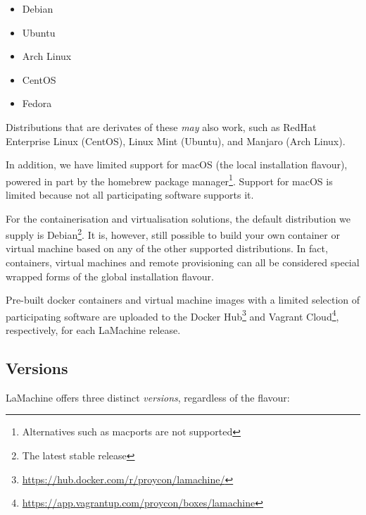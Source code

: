 \documentclass[a4paper,11pt]{article}
\begin{document}
\begin{itemize}
    \item Debian
    \item Ubuntu
    \item Arch Linux
    \item CentOS
    \item Fedora
\end{itemize}

Distributions that are derivates of these \emph{may} also work, such as RedHat Enterprise Linux (CentOS), Linux Mint (Ubuntu),
and Manjaro (Arch Linux).

In addition, we have limited support for macOS (the local installation flavour), powered in part by the homebrew package
manager\footnote{Alternatives such as macports are not supported}. Support for macOS is limited because not all participating
software supports it.

For the containerisation and virtualisation solutions, the default distribution we supply is Debian\footnote{The latest
stable release}. It is, however, still possible to build your own container or virtual machine based on any of the other supported
distributions. In fact, containers, virtual machines and remote provisioning can all be considered special wrapped forms of
the global installation flavour.

Pre-built docker containers and virtual machine images with a limited selection of participating software are uploaded
to the Docker Hub\footnote{\url{https://hub.docker.com/r/proycon/lamachine/}} and Vagrant
Cloud\footnote{\url{https://app.vagrantup.com/proycon/boxes/lamachine}}, respectively, for each LaMachine release.

\subsection{Versions}

LaMachine offers three distinct \emph{versions}, regardless of the flavour:
\end{document}
